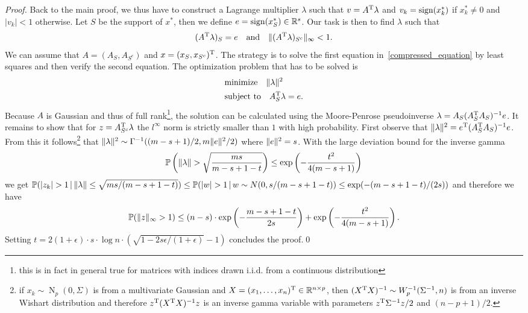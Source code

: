 \documentclass{article} %
\newcommand{\given}{\,|\,}
\begin{document}
\begin{proof}
Back to the main proof, we thus have to construct a Lagrange multiplier $\lambda$ such that $v = A^{\rm T} \lambda$ and $v_k = \operatorname{sign}(x^*_k)$ if $x^*_k\neq 0$ and $|v_k| < 1$ otherwise. Let $S$ be the support of $x^*$, then we define $e = \operatorname{sign}(x^*_S)\in \mathbb{R}^s$. Our task is then to find $\lambda$ such that
\begin{align}\label{compressed_equation}
  (A^{\rm T} \lambda)_S = e\quad\text{and}\quad \lVert(A^{\rm T} \lambda)_{S^c}\rVert_\infty < 1.
\end{align}
  We can assume that $A = (A_S, A_{S^c})$ and $x = (x_S, x_{S^c})^{\rm T}$. The strategy is to solve the first equation in~\eqref{compressed_equation} by least squares and then verify the second equation. The optimization problem that has to be solved is
  \begin{align*}
    &\text{minimize}\quad \lVert\lambda\rVert^2\\
    &\text{subject to}\quad A_S^{\rm T} \lambda = e.
  \end{align*}
    Because $A$ is Gaussian and thus of full rank\footnote{this is in fact in general true for matrices with indices drawn i.i.d. from a continuous distribution}, the solution can be calculated using the Moore-Penrose pseudoinverse $\lambda = A_S(A_S^{\rm T} A_S)^{-1} e$.
It remains to show that for $z = A_{S^c}^{\rm T}\lambda$ the $l^{\infty}$ norm is strictly smaller than $1$ with high probability. First observe that $\|\lambda\|^2 = e^{\rm T}(A_S^{\rm T} A_S)^{-1} e$.
From this it follows\footnote{if $x_k \sim \operatorname{N}_p(0, \Sigma)$ is from a multivariate Gaussian and $X = (x_1, \dots, x_n)^{\rm T} \in \mathbb{R}^{n\times p}$, then $(X^{\rm T} X)^{-1} \sim W_p^{-1}(\Sigma^{-1}, n)$ is from an inverse Wishart distribution and therefore $z^{\rm T} (X^{\rm T} X)^{-1} z$ is an inverse gamma variable with parameters $z^{\rm T} \Sigma^{-1} z/2$ and $(n-p+1)/2$.} that $\|\lambda\|^2\sim \Gamma^{-1}((m-s+1)/2, m \lVert e\rVert^2/2)$ where $\lVert e\rVert^2 = s$. With the large deviation bound for the inverse gamma
\begin{align*}
  \mathbb{P}\left(\lVert\lambda\rVert > \sqrt{\frac{ms}{m-s+1-t}}\right) \leq
  \exp\left(-\frac{t^2}{4(m-s+1)}\right)
\end{align*}
we get $\P(|z_k| > 1 \given \norm{\lambda} \leq
\sqrt{ms/(m-s+1-t)}) \leq \P(|w| > 1\given w\sim N(0, s/(m-s+1-t))
\leq \exp(-(m-s+1-t)/(2s))$ and therefore we have
\begin{equation*}
  \mathbb{P}(\lVert z\rVert_\infty > 1) \leq (n-s)\cdot \exp\left(-\frac{m-s+1-t}{2s}\right) + 
  \exp\left(-\frac{t^2}{4(m-s+1)}\right).
\end{equation*}
Setting $t = 2(1+\epsilon) \cdot s\cdot \log n
\cdot (\sqrt{1-2s\epsilon/(1+\epsilon)} - 1)$ concludes the proof.\qed
    \end{proof}
\end{document}
